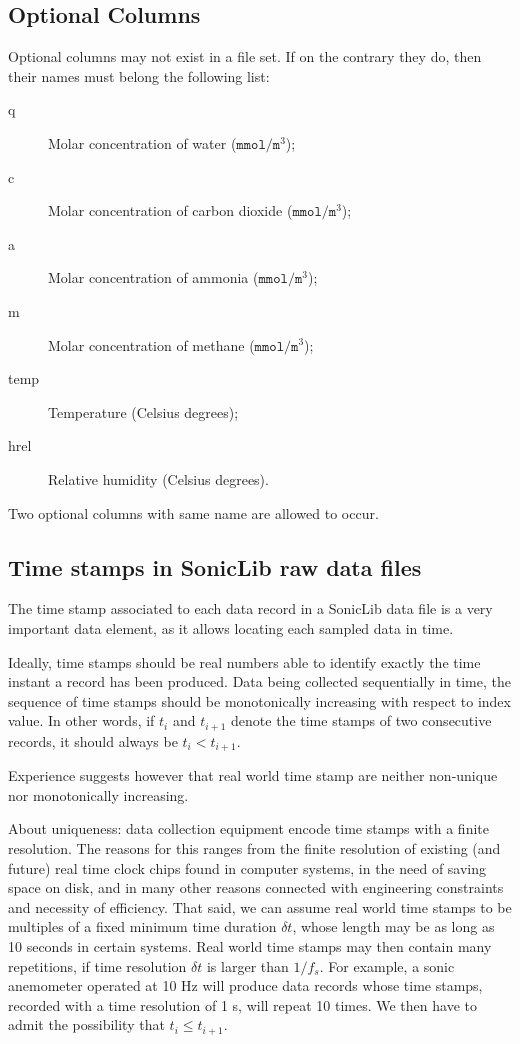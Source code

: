 \documentclass[a4paper,10pt]{book}
\begin{document}
\subsection{Optional Columns}
\label{sec:OptionalColumns}

Optional columns may not exist in a file set. If on the contrary they do, then their names must belong the following list:

\begin{description}
 \item[q] Molar concentration of water ($\mathtt{mmol}/\mathtt{m}^{3}$); 
 \item[c] Molar concentration of carbon dioxide ($\mathtt{mmol}/\mathtt{m}^{3}$); 
 \item[a] Molar concentration of ammonia ($\mathtt{mmol}/\mathtt{m}^{3}$); 
 \item[m] Molar concentration of methane ($\mathtt{mmol}/\mathtt{m}^{3}$); 
 \item[temp] Temperature (Celsius degrees); 
 \item[hrel] Relative humidity (Celsius degrees). 
\end{description}

Two optional columns with same name are allowed to occur.

\subsection{Time stamps in SonicLib raw data files}
\label{sec:SonicLib Raw File Time Stamps}

The time stamp associated to each data record in a SonicLib data file is a very important data element, as it allows locating each sampled data in time.

Ideally, time stamps should be real numbers able to identify exactly the time instant a record has been produced. Data being collected sequentially in time, the sequence of time stamps should be monotonically increasing with respect to index value. In other words, if $t_{i}$ and $t_{i+1}$ denote the time stamps of two consecutive records, it should always be $t_{i} < t_{i+1}$.

Experience suggests however that real world time stamp are neither non-unique nor monotonically increasing.

About uniqueness: data collection equipment encode time stamps with a finite resolution. The reasons for this ranges from the finite resolution of existing (and future) real time clock chips found in computer systems, in the need of saving space on disk, and in many other reasons connected with engineering constraints and necessity of efficiency. That said, we can assume real world time stamps to be multiples of a fixed minimum time duration $\delta t$, whose length may be as long as 10 seconds in certain systems. Real world time stamps may then contain many repetitions, if time resolution $\delta t$ is larger than $1/f_{s}$. For example, a sonic anemometer operated at 10 Hz will produce data records whose time stamps, recorded with a time resolution of 1 s, will repeat 10 times. We then have to admit the possibility that $t_{i} \le t_{i+1}$.
\end{document}
